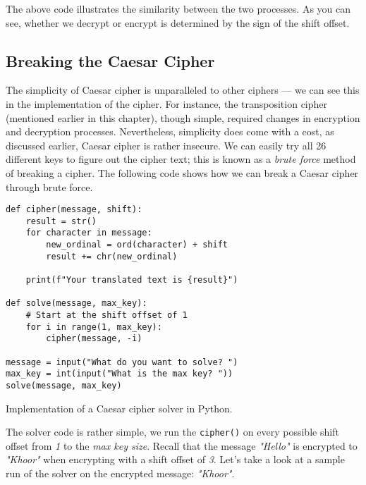 The above code illustrates the similarity between the two processes. As you can see, whether we decrypt or encrypt is 
determined by the sign of the shift offset.

\subsection{Breaking the Caesar Cipher}

The simplicity of Caesar cipher is unparalleled to other ciphers --- we can see this in the implementation of the cipher.
For instance, the transposition cipher (mentioned earlier in this chapter), though simple, required changes in encryption and
decryption processes. Nevertheless, simplicity does come with a cost, as discussed earlier, Caesar cipher is rather insecure. 
We can easily try all 26 different keys to figure out the cipher text; this is known as a \textit{brute force} method
of breaking a cipher. The following code shows how we can break a Caesar cipher through brute force. 

\begin{listing}[H]
    \begin{verbatim}
def cipher(message, shift):
    result = str()
    for character in message:
        new_ordinal = ord(character) + shift
        result += chr(new_ordinal)
        
    print(f"Your translated text is {result}")
    
def solve(message, max_key):
    # Start at the shift offset of 1
    for i in range(1, max_key):
        cipher(message, -i)
    
message = input("What do you want to solve? ")
max_key = int(input("What is the max key? "))
solve(message, max_key)  
    \end{verbatim}
    \caption{Implementation of a Caesar cipher solver in Python.}
\end{listing}

The solver code is rather simple, we run the \texttt{cipher()} on every possible shift offset from \textit{1}
to the \textit{max key size}. Recall that the message \textit{"Hello"} is encrypted to \textit{"Khoor"} when encrypting with a 
shift offset of \textit{3}. Let's take a look at a sample run of the solver on the encrypted message: \textit{"Khoor"}.

\newcommand{\reducedstrut}{\vrule width 0pt height .9\ht\strutbox depth .9\dp\strutbox\relax}
\newcommand{\yellow}[1]{%
  \begingroup
  \setlength{\fboxsep}{0pt}%
  \colorbox{yellow}{\reducedstrut#1\/}%
  \endgroup
}

